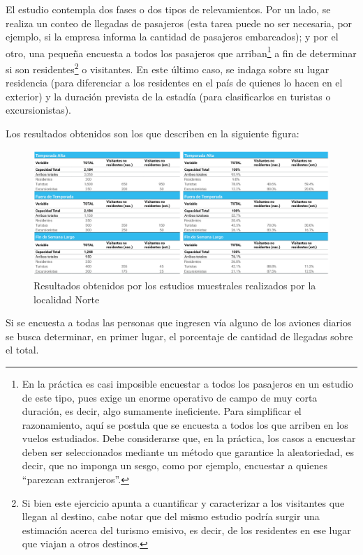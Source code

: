 \documentclass[
]{book}
\begin{document}
El estudio contempla dos fases o dos tipos de relevamientos. Por un lado, se realiza un conteo de llegadas de pasajeros (esta tarea puede no ser necesaria, por ejemplo, si la empresa informa la cantidad de pasajeros embarcados); y por el otro, una pequeña encuesta a todos los pasajeros que arriban\footnote{En la práctica es casi imposible encuestar a todos los pasajeros en un estudio de este tipo, pues exige un enorme operativo de campo de muy corta duración, es decir, algo sumamente ineficiente. Para simplificar el razonamiento, aquí se postula que se encuesta a todos los que arriben en los vuelos estudiados. Debe considerarse que, en la práctica, los casos a encuestar deben ser seleccionados mediante un método que garantice la aleatoriedad, es decir, que no imponga un sesgo, como por ejemplo, encuestar a quienes ``parezcan extranjeros''.} a fin de determinar si son residentes\footnote{Si bien este ejercicio apunta a cuantificar y caracterizar a los visitantes que llegan al destino, cabe notar que del mismo estudio podría surgir una estimación acerca del turismo emisivo, es decir, de los residentes en ese lugar que viajan a otros destinos.} o visitantes. En este último caso, se indaga sobre su lugar residencia (para diferenciar a los residentes en el país de quienes lo hacen en el exterior) y la duración prevista de la estadía (para clasificarlos en turistas o excursionistas).

Los resultados obtenidos son los que describen en la siguiente figura:

\begin{figure}

{\centering \includegraphics[width=0.8\linewidth]{imagenes/figura06} 

}

\caption{Resultados obtenidos por los estudios muestrales realizados por la localidad Norte}\label{fig:resultadosobtenidos}
\end{figure}

Si se encuesta a todas las personas que ingresen vía alguno de los aviones diarios se busca determinar, en primer lugar, el porcentaje de cantidad de llegadas sobre el total.
\end{document}
